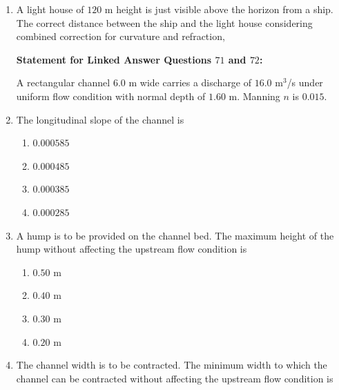 \documentclass[journal]{IEEEtran}
\begin{document}
\begin{enumerate}
\item A light house of $120$ m height is just visible above the horizon from a ship. The correct distance  between the ship and the light house considering combined correction for curvature and refraction, \hfill {}
\begin{enumerate}
\end{enumerate}



\textbf{Statement for Linked Answer Questions $71$ and $72$:}


A rectangular channel $6.0$ m wide carries a discharge of $16.0$ m$^3$/s under uniform flow condition with normal depth of $1.60$ m. Manning $n$ is $0.015$. 



\item The longitudinal slope of the channel is \hfill {}

\begin{enumerate}
\item $0.000585$
\item $0.000485$
\item $0.000385$
\item $0.000285$
\end{enumerate}



\item A hump is to be provided on the channel bed. The maximum height of the hump without affecting the upstream flow condition is \hfill {}

\begin{enumerate}
\item $0.50$ m
\item $0.40$ m
\item $0.30$ m
\item $0.20$ m
\end{enumerate}



\item The channel width is to be contracted. The minimum width to which the channel can be contracted without affecting the upstream flow condition is \hfill {}


\end{enumerate}
\end{document}
